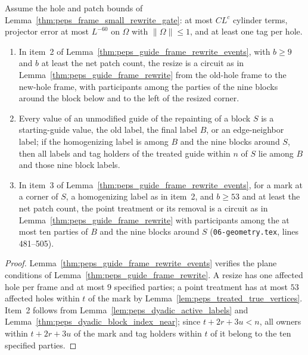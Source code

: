 \begin{lemma}
    \label{thm:peps_guide_frame_resize_treatment_gates}
    \leanok
    Assume the hole and patch bounds of Lemma~\ref{thm:peps_frame_small_rewrite_gate}: at most $CL^c$ cylinder terms, projector error at most
    $L^{-60}$ on $\Omega$ with $\lVert\Omega\rVert\le1$, and at least one tag per hole.
    \begin{enumerate}
        \item In item~2 of
              Lemma~\ref{thm:peps_guide_frame_rewrite_events}, with $b\ge 9$ and $b$ at least the net patch count, the resize is a circuit
              as in Lemma~\ref{thm:peps_guide_frame_rewrite} from the old-hole frame to the new-hole frame, with participants among the parties of the nine
              blocks around the block below and to the left of the resized
              corner.
        \item Every value of an unmodified guide of the repainting of a block $S$ is a starting-guide value, the old label, the final label $B$, or an edge-neighbor label; if the homogenizing label is among $B$ and the nine blocks around $S$, then all labels and tag holders of the treated guide within $n$ of $S$ lie among $B$ and those nine block labels.
        \item In item~3 of
              Lemma~\ref{thm:peps_guide_frame_rewrite_events}, for a mark at a
              corner of $S$, a homogenizing label as in item~2, and $b\ge 53$ and at least the net patch count, the point treatment
              or its removal is a circuit as in
              Lemma~\ref{thm:peps_guide_frame_rewrite} with participants among the at most ten parties of $B$ and the nine blocks around
              $S$ (\texttt{06-geometry.tex}, lines 481--505).
    \end{enumerate}
\end{lemma}

\begin{proof}\leanok
    Lemma~\ref{thm:peps_guide_frame_rewrite_events} verifies the plane conditions of
    Lemma~\ref{thm:peps_guide_frame_rewrite}. A resize has one affected hole per frame and
    at most $9$ specified parties; a point treatment has at most $53$ affected holes within $t$ of the mark by
    Lemma~\ref{lem:peps_treated_true_vertices}. Item~2 follows from Lemma~\ref{lem:peps_dyadic_active_labels} and Lemma~\ref{thm:peps_dyadic_block_index_near}; since $t+2r+3u<n$, all owners within $t+2r+3u$ of the mark and tag holders within $t$ of it belong to the ten specified parties.
\end{proof}

